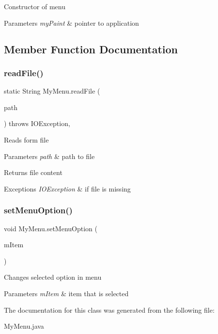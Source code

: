 Constructor of menu 
\begin{DoxyParams}{Parameters}
{\em my\+Paint} & pointer to application \\
\hline
\end{DoxyParams}


\subsection{Member Function Documentation}
\mbox{\label{classMyMenu_a76a17ad2e9001ae8d7caf0ff62eb2d37}} 
\subsubsection{\texorpdfstring{read\+File()}{readFile()}}
{\footnotesize\ttfamily static String My\+Menu.\+read\+File (\begin{DoxyParamCaption}\item[{String}]{path }\end{DoxyParamCaption}) throws I\+O\+Exception\hspace{0.3cm}{\ttfamily [inline]}, {\ttfamily [static]}}

Reads form file 
\begin{DoxyParams}{Parameters}
{\em path} & path to file \\
\hline
\end{DoxyParams}
\begin{DoxyReturn}{Returns}
file content 
\end{DoxyReturn}

\begin{DoxyExceptions}{Exceptions}
{\em I\+O\+Exception} & if file is missing \\
\hline
\end{DoxyExceptions}
\mbox{\label{classMyMenu_a8420816b90a535a554eead927c40ef95}} 
\subsubsection{\texorpdfstring{set\+Menu\+Option()}{setMenuOption()}}
{\footnotesize\ttfamily void My\+Menu.\+set\+Menu\+Option (\begin{DoxyParamCaption}\item[{J\+Menu\+Item}]{m\+Item }\end{DoxyParamCaption})\hspace{0.3cm}{\ttfamily [inline]}}

Changes selected option in menu 
\begin{DoxyParams}{Parameters}
{\em m\+Item} & item that is selected \\
\hline
\end{DoxyParams}


The documentation for this class was generated from the following file\+:\begin{DoxyCompactItemize}
\item 
My\+Menu.\+java\end{DoxyCompactItemize}
